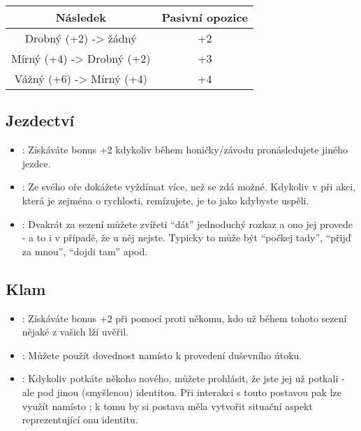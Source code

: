 \documentclass[../main.tex]{subfiles}
\begin{document}
\begin{table}[h]  
\centering
\begin{tabular}[h]{c|c}
Následek & Pasivní opozice \\ \hline
Drobný (+2) -> žádný & +2 \\
Mírný (+4) -> Drobný (+2) & +3 \\
Vážný (+6) -> Mírný (+4) & +4\\
\end{tabular}
\end{table}

\subsection{Jezdectví}
\label{sec:trik-jezd}
\begin{itemize}
  
\item{}:
\label{sec:jezdectvi-kliste}
Získáváte bonus +2 kdykoliv během honičky/závodu pronásledujete jiného jezdce.

\item{}:
\label{sec:jezdectvi-hyje}
Ze svého oře dokážete vyždímat více, než se zdá možné. Kdykoliv v při akci, která je zejména o rychlosti, remízujete, je to jako kdybyste uspěli.

\item{}:
\label{sec:jezdectvi-kamos}
Dvakrát za sezení můžete zvířeti ``dát'' jednoduchý rozkaz a ono jej provede - a to i v případě, že u něj nejste. Typicky to může být ``počkej tady'', ``přijď za mnou'', ``dojdi tam'' apod.

\end{itemize}

\subsection{Klam}
\label{sec:trik-klam}

\begin{itemize}
\item{}:
\label{sec:klam-lez}
Získáváte bonus +2 při  pomocí  proti někomu, kdo už během tohoto sezení nějaké z vašich lží uvěřil.

\item{}:
\label{sec:klam-mysl}
Můžete použít dovednost  namísto  k provedení duševního útoku.

\item{}:
\label{sec:klam-muz}
Kdykoliv potkáte někoho nového, můžete prohlásit, že jste jej už potkali - ale pod jinou (smyšlenou) identitou. Při interakci s touto postavou pak lze využít  namísto ; k tomu by si postava měla vytvořit situační aspekt reprezentující onu identitu.
\end{itemize}
\end{document}
